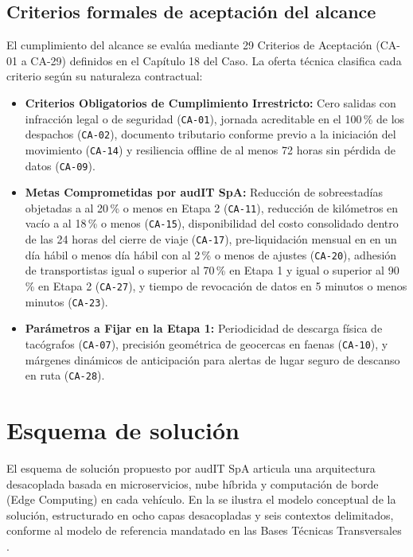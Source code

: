 \subsection{Criterios formales de aceptación del alcance}\label{sec:3-criterios-aceptacion}

El cumplimiento del alcance se evalúa mediante 29 Criterios de Aceptación (CA-01 a CA-29) definidos en el
Capítulo 18 del Caso. La oferta técnica clasifica cada criterio según su naturaleza contractual:

\begin{itemize}
  \item \textbf{Criterios Obligatorios de Cumplimiento Irrestricto:} Cero salidas con infracción legal o de
  seguridad (\texttt{CA-01}), jornada acreditable en el 100\,\% de los despachos (\texttt{CA-02}), documento
  tributario conforme previo a la iniciación del movimiento (\texttt{CA-14}) y resiliencia offline de al menos
  72 horas sin pérdida de datos (\texttt{CA-09}).
  \item \textbf{Metas Comprometidas por audIT SpA:} Reducción de sobreestadías objetadas a al 20\,\% o menos en
  Etapa 2 (\texttt{CA-11}), reducción de kilómetros en vacío a al 18\,\% o menos (\texttt{CA-15}), disponibilidad
  del costo consolidado dentro de las 24 horas del cierre de viaje (\texttt{CA-17}), pre-liquidación mensual
  en en un día hábil o menos día hábil con al 2\,\% o menos de ajustes (\texttt{CA-20}), adhesión de transportistas igual o superior al 70\,\% en
  Etapa 1 y igual o superior al 90\,\% en Etapa 2 (\texttt{CA-27}), y tiempo de revocación de datos en 5 minutos o menos minutos (\texttt{CA-23}).
  \item \textbf{Parámetros a Fijar en la Etapa 1:} Periodicidad de descarga física de tacógrafos (\texttt{CA-07}),
  precisión geométrica de geocercas en faenas (\texttt{CA-10}), y márgenes dinámicos de anticipación para alertas de
  lugar seguro de descanso en ruta (\texttt{CA-28}).
\end{itemize}

\section{Esquema de solución}\label{sec:3-esquema-solucion}

El esquema de solución propuesto por audIT SpA articula una arquitectura desacoplada basada en microservicios,
nube híbrida y computación de borde (Edge Computing) en cada vehículo.
En la  se ilustra el modelo conceptual de la solución, estructurado en ocho capas
desacopladas y seis contextos delimitados, conforme al modelo de referencia mandatado en las Bases Técnicas
Transversales .

